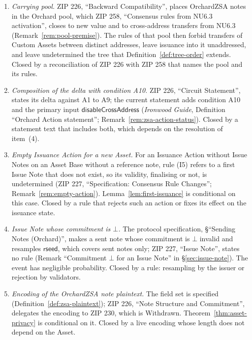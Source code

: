 \documentclass[11pt,a4paper]{article}
\theoremstyle{definition}
\begin{document}
\begin{enumerate}[label=(\arabic*)]
  that encodes the OrchardZSA bundle, the Issuance Bundle and
  $\mathsf{enableZSA}$, with a signature digest that meets
  Remark~\ref{rem:digest-commitments}.
\item \emph{Carrying pool.} ZIP 226, ``Backward Compatibility'', places
  OrchardZSA notes in the Orchard pool, which ZIP 258, ``Consensus rules
  from NU6.3 activation'', closes to new value and to cross-address
  transfers from NU6.3 (Remark~\ref{rem:pool-premise}). The rules of that
  pool then forbid transfers of Custom Assets between distinct addresses,
  leave issuance into it unaddressed, and leave undetermined the tree that
  Definition~\ref{def:tree-order} extends. Closed by a reconciliation of
  ZIP 226 with ZIP 258 that names the pool and its rules.
\item \emph{Composition of the delta with condition A10.} ZIP 226,
  ``Circuit Statement'', states its delta against A1 to A9; the current
  statement adds condition A10 and the primary input
  $\mathsf{disableCrossAddress}$ (\emph{Ironwood Guide}, Definition
  ``Orchard Action statement''; Remark~\ref{rem:zsa-action-status}).
  Closed by a statement text that includes both, which depends on the
  resolution of item~(4).
\item \emph{Empty Issuance Action for a new Asset.} For an Issuance Action
  without Issue Notes on an Asset Base without a reference note, rule (I5)
  refers to a first Issue Note that does not exist, so its validity,
  finalising or not, is undetermined (ZIP 227, ``Specification: Consensus
  Rule Changes''; Remark~\ref{rem:empty-action}).
  Lemma~\ref{lem:first-issuance} is conditional on this case. Closed by a
  rule that rejects such an action or fixes its effect on the issuance
  state.
\item \emph{Issue Note whose commitment is $\bot$.} The protocol
  specification, \S``Sending Notes (Orchard)'', makes a sent note whose
  commitment is $\bot$ invalid and resamples $\mathsf{rseed}$, which
  covers sent notes only; ZIP 227, ``Issue Note'', states no rule (Remark
  ``Commitment $\bot$ for an Issue Note'' in \S\ref{sec:issue-note}). The
  event has negligible probability. Closed by a rule: resampling by the
  issuer or rejection by validators.
\item \emph{Encoding of the OrchardZSA note plaintext.} The field set is
  specified (Definition~\ref{def:zsa-plaintext}); ZIP 226, ``Note Structure
  and Commitment'', delegates the encoding to ZIP 230, which is Withdrawn.
  Theorem~\ref{thm:asset-privacy} is conditional on it. Closed by a live
  encoding whose length does not depend on the Asset.
\end{enumerate}
\end{document}
